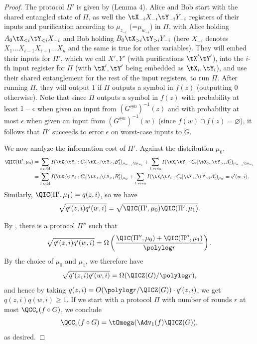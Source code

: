 \begin{proof}
The protocol $\Pi'$ is given by \cite{Tou15} (Lemma 4). Alice and Bob start with the shared entangled state of $\Pi$, as well the $\tX_{-i}X_{-i}\tY_{-i}Y_{-i}$ registers of their inputs and purification according to $\mu_{z_{-i}}$ (=$\mu_{w_{-i}}$) in $\Pi$, with Alice holding $A_0\tX_{<i}\tY_{<i}X_{-i}$ and Bob holding $B_0\tX_{>i}\tY_{>i}Y_{-i}$ (here $X_{-i}$ denotes $X_1\ldots X_{i-1}X_{i+1}\ldots X_n$ and the same is true for other variables). They will embed their inputs for $\Pi'$, which we call $X',Y'$ (with purifications $\tX'\tY'$), into the $i$-th input register for $\Pi$ (with $\tX', \tY'$ being embedded as $\tX_i, \tY_i$), and use their shared entanglement for the rest of the input registers, to run $\Pi$. After running $\Pi$, they will output $1$ if
$\Pi$ outputs a symbol in $f(z)$ (outputting $0$ otherwise).
Note that since $\Pi$ outputs a symbol in $f(z)$
with probability at least $1-\epsilon$ when given an input
from $(G^{\oplus n})^{-1}(z)$ and with probability at most $\epsilon$
when given an input from $(G^{\oplus n})^{-1}(w)$
(since $f(w)\cap f(z)=\varnothing$), it follows that
$\Pi'$ succeeds to error $\epsilon$ on worst-case inputs
to $G$.

We now analyze the information cost of $\Pi'$. Against the distribution $\mu_0$,
\begin{align*}
\QIC(\Pi', \mu_0) & = \sum_{t \text{ odd}}I(\tX_i\tY_i:C_t|\tX_{<i}\tY_{<i}B'_t)_{\mu_{w_{-i}}\otimes \mu_{w_i}} + \sum_{t\text{ even}}I(\tX_i\tY_i:C_t|\tX_{>i}\tY_{>i}A'_t)_{\mu_{w_{-i}}\otimes\mu_{w_i}} \\
 & = \sum_{t \text{ odd}}I(\tX_i\tY_i:C_t|\tX_{<i}\tY_{<i}B'_t)_{\mu_w} + \sum_{t\text{ even}}I(\tX_i\tY_i:C_t|\tX_{>i}\tY_{>i}A'_t)_{\mu_w} = q'(w,i).
\end{align*}
Similarly, $\QIC(\Pi',\mu_1)=q(z,i)$,
so we have
\[\sqrt{q'(z,i)q'(w,i)}
=\sqrt{\QIC(\Pi',\mu_0)\QIC(\Pi',\mu_1)}.\]

By , there is a protocol $\Pi''$ such that
\[\sqrt{q'(z,i)q'(w,i)}= \Omega\left(\frac{\QIC(\Pi'',\mu_0)+\QIC(\Pi'',\mu_1)}
{\polylog r}\right).\]
By the choice of $\mu_0$ and $\mu_1$, we therefore have
\[\sqrt{q'(z,i)q'(w,i)}=\Omega(\QICZ(G)/\polylog r),\]
and hence by taking $q(z,i)=O(\polylog r/\QICZ(G))\cdot q'(z,i)$,
we get $q(z,i)q(w,i)\ge 1$. If we start with a protocol $\Pi$
with number of rounds $r$ at most $\QCC_{\epsilon}(f\circ G)$,
we conclude
\[\QCC_\epsilon(f\circ G)=\tOmega(\Adv_1(f)\QICZ(G)),\]
as desired.
\end{proof}
